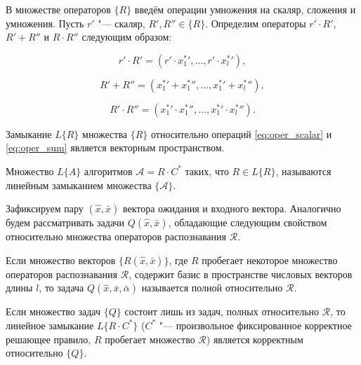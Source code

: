 В множестве операторов $\{R\}$ введём операции умножения на скаляр, сложения и умножения. Пусть $r'$ "--- скаляр, $R',R''\in\{R\}$. Определим операторы $r'{\cdot}R'$, $R'+R''$ и $R{\cdot}R''$ следующим образом:
	
\begin{equation}
\label{eq:oper_scalar}
	r'{\cdot}R'=(r'{\cdot}{x_1^*}',\dots,r'{\cdot}{x_l^*}'),
\end{equation}

\begin{equation}
\label{eq:oper_sum}
	R'+R''=({x_1^*}'+{x_1^*}'',\dots,{x_1^*}'+{x_l^*}''),
\end{equation}

\begin{equation}
\label{eq:oper_mult}
	R'{\cdot}R''=({x_1^*}'{\cdot}{x_1^*}'',\dots,{x_1^*}'{\cdot}{x_l^*}'').
\end{equation}
	
\begin{Pred}
	Замыкание $L\{R\}$ множества $\{R\}$ относительно операций \eqref{eq:oper_scalar} и \eqref{eq:oper_sum} является векторным пространством.
\end{Pred}

\begin{Def}
	Множество $L\{A\}$ алгоритмов $\mathcal{A}=R{\cdot}C^*$ таких, что $R{\in}L\{R\}$, называются линейным замыканием множества $\{\mathcal{A}\}$.
\end{Def}

Зафиксируем пару $(\hat{x},\bar{x})$ вектора ожидания и входного вектора. Аналогично \cite{Zhuravlev1977} будем рассматривать задачи $Q(\hat{x},\bar{x})$, обладающие следующим свойством относительно множества операторов распознавания $\mathcal{R}$.
	
\begin{Def}
	Если множество векторов $\{R(\hat{x},\bar{x})\}$, где $R$ пробегает некоторое множество операторов распознавания $\mathcal{R}$, содержит базис в пространстве числовых векторов длины $l$, то задача $Q(\hat{x},\bar{x},\bar{\alpha})$ называется полной относительно $\mathcal{R}$.
\end{Def}

\begin{Pred}
	\label{pred:correctness}
	Если множество задач $\{Q\}$ состоит лишь из задач, полных относительно $\mathcal R$, то линейное замыкание $L\{R{\cdot}C^*\}$ ($C^*$ "--- произвольное фиксированное корректное решающее правило, $R$ пробегает множество $\mathcal{R}$) является корректным относительно $\{Q\}$.
\end{Pred}

